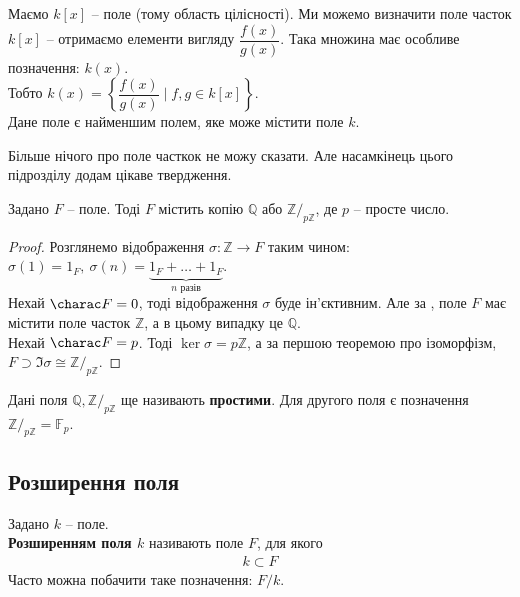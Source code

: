 \documentclass{math_library}
\begin{document}
\begin{example}
Маємо $k[x]$ -- поле (тому область цілісності). Ми можемо визначити поле часток $k[x]$ -- отримаємо елементи вигляду $\dfrac{f(x)}{g(x)}$. Така множина має особливе позначення: $k(x)$.\\
Тобто $k(x) = \left\{ \dfrac{f(x)}{g(x)} \mid f,g \in k[x] \right\}$.\\
Дане поле є найменшим полем, яке може містити поле $k$.
\end{example}

Більше нічого про поле часткок не можу сказати. Але насамкінець цього підрозділу додам цікаве твердження.

\begin{proposition}
\label{field_contains_either_rationals_or_residue_claa_mod_p}
Задано $F$ -- поле. Тоді $F$ містить копію $\mathbb{Q}$ або $\mathbb{Z}/_{p \mathbb{Z}}$, де $p$ -- просте число.
\end{proposition}

\begin{proof}
Розглянемо відображення $\sigma \colon \mathbb{Z} \to F$ таким чином: $\sigma(1) = 1_F,\ \sigma(n) = \underbrace{1_F+\dots+1_F}_{n\text{ разів}}$.\\
Нехай $\charac F = 0$, тоді відображення $\sigma$ буде ін'єктивним. Але за  , поле $F$ має містити поле часток $\mathbb{Z}$, а в цьому випадку це $\mathbb{Q}$.\\
Нехай $\charac F = p$. Тоді $\ker \sigma = p \mathbb{Z}$, а за першою теоремою про ізоморфізм, $F \supset \Im \sigma \cong \mathbb{Z}/_{p \mathbb{Z}}$.
\end{proof}

Дані поля $\mathbb{Q}, \mathbb{Z}/_{p \mathbb{Z}}$ ще називають \textbf{простими}. Для другого поля є позначення $\mathbb{Z}/_{p \mathbb{Z}} = \mathbb{F}_p$.

\subsection{Розширення поля}
\begin{definition}
Задано $k$ -- поле.\\
\textbf{Розширенням поля $k$} називають поле $F$, для якого
\begin{align*}
k \subset F
\end{align*}
Часто можна побачити таке позначення: $F/k$.
\end{definition}
\end{document}
